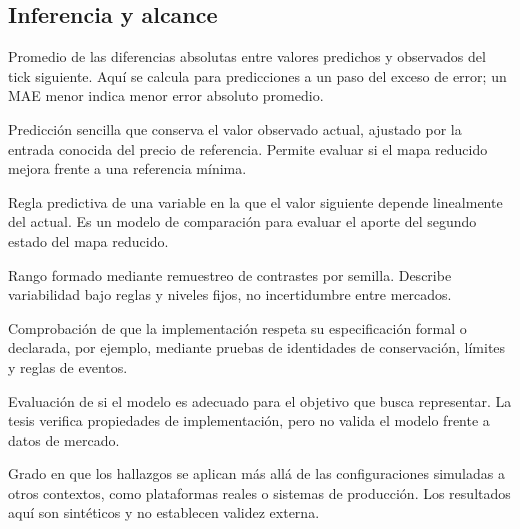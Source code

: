 \subsection*{Inferencia y alcance}
\begin{description}[style=unboxed,leftmargin=0pt,labelwidth=0pt,labelsep=0.5em,itemsep=0.1em]
  \item[MAE --- error absoluto medio:] Promedio de las diferencias absolutas entre valores predichos y observados del tick siguiente. Aquí se calcula para predicciones a un paso del exceso de error; un MAE menor indica menor error absoluto promedio.
  \item[Referencia de persistencia:] Predicción sencilla que conserva el valor observado actual, ajustado por la entrada conocida del precio de referencia. Permite evaluar si el mapa reducido mejora frente a una referencia mínima.
  \item[Autorregresión escalar:] Regla predictiva de una variable en la que el valor siguiente depende linealmente del actual. Es un modelo de comparación para evaluar el aporte del segundo estado del mapa reducido.
  \item[Intervalo Monte Carlo:] Rango formado mediante remuestreo de contrastes por semilla. Describe variabilidad bajo reglas y niveles fijos, no incertidumbre entre mercados.
  \item[Verificación:] Comprobación de que la implementación respeta su especificación formal o declarada, por ejemplo, mediante pruebas de identidades de conservación, límites y reglas de eventos.
  \item[Validación:] Evaluación de si el modelo es adecuado para el objetivo que busca representar. La tesis verifica propiedades de implementación, pero no valida el modelo frente a datos de mercado.
  \item[Validez externa:] Grado en que los hallazgos se aplican más allá de las configuraciones simuladas a otros contextos, como plataformas reales o sistemas de producción. Los resultados aquí son sintéticos y no establecen validez externa.
\end{description}
\endgroup
